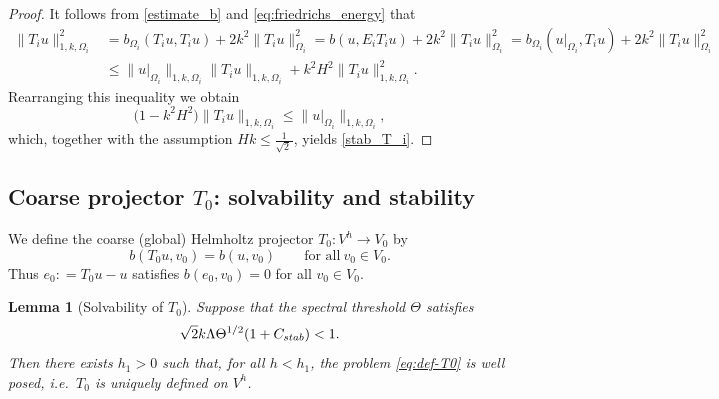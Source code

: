 \documentclass[preprint,3p,times]{elsarticle}
\newcommand{\assign}{\mathrel{\mathop:}=}
\newcommand{\Cstab}{C_{\textup{\textsf{stab}}}}
\newtheorem{lemma}[theorem]{Lemma}
\theoremstyle{definition}
\numberwithin{equation}{section}
\begin{document}
\begin{proof}
It follows from \eqref{estimate_b} and \eqref{eq:friedrichs_energy} that
\begin{align*}
	\|T_i u\|_{1,k,\Omega_i}^2
	&= b_{\Omega_i}(T_i u,T_i u) + 2k^2\|T_i u\|_{\Omega_i}^2
	= b(u,E_i T_i u) + 2k^2\|T_i u\|_{\Omega_i}^2
	= b_{\Omega_i}(u|_{\Omega_i},T_i u) + 2k^2\|T_i u\|_{\Omega_i}^2
	\\[1ex]
	&\le \|u|_{\Omega_i}\|_{1,k,\Omega_i} \|T_i u\|_{1,k,\Omega_i} + k^2 H^2\|T_i u\|_{1,k,\Omega_i}^2.
\end{align*}
Rearranging this inequality we obtain
\[
	\bigl(1-k^2 H^2\bigr)\|T_i u\|_{1,k,\Omega_i}
	\le \|u|_{\Omega_i}\|_{1,k,\Omega_i},
\]
which, together with the assumption $Hk\le\frac{1}{\sqrt{2}\,}$, yields \eqref{stab_T_i}.
\end{proof}



\subsection{Coarse projector $T_0$: solvability and stability}
We define the coarse (global) Helmholtz projector $T_0:V^h\to V_0$ by
\begin{equation}\label{eq:def-T0}
	b(T_0 u, v_0) = b(u, v_0) \qquad \text{for all} \ v_0\in V_0.
\end{equation}
Thus $e_0\assign T_0 u-u$ satisfies $b(e_0,v_0)=0$ for all $v_0\in V_0$.

\begin{lemma}[Solvability of $T_0$]\label{lem:T0-solv}
Suppose that the spectral threshold $\Theta$ satisfies
\begin{equation}\label{eq:T0-infsup}
	\sqrt{2} k\Lambda\Theta^{1/2}(1+\Cstab) < 1.
\end{equation}
Then there exists $h_1>0$ such that, for all $h<h_1$, the problem \eqref{eq:def-T0} is well posed, 
i.e.\ $T_0$ is uniquely defined on $V^h$.
\end{lemma}
\end{document}

